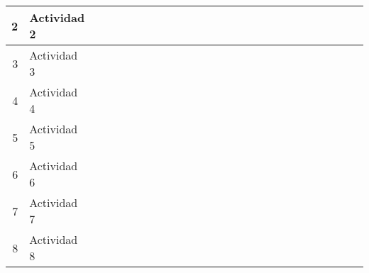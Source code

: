 \begin{landscape}
\begin{table}[htbp]
{\begin{tabular}{|r|l|r|r|r|r|r|r|r|r|r|r|r|r|r|r|r|r|r|r|r|r|r|r|r|r|}
			\midrule
			2     & Actividad 2 &       &       &       & \cellcolor[rgb]{ .557,  .663,  .859} & \cellcolor[rgb]{ .557,  .663,  .859} & \cellcolor[rgb]{ .557,  .663,  .859} & \cellcolor[rgb]{ .557,  .663,  .859} &       &       &       &       &       &       &       &       &       &       &       &       &       &       &       &       &  \\
			\midrule
			3     & Actividad 3 & \cellcolor[rgb]{ .557,  .663,  .859} & \cellcolor[rgb]{ .557,  .663,  .859} & \cellcolor[rgb]{ .557,  .663,  .859} &       &       &       &       &       &       &       &       &       &       &       &       &       &       &       &       &       &       &       &       &  \\
			\midrule
			4     & Actividad 4 &       &       &       &       &       &       &       & \cellcolor[rgb]{ .557,  .663,  .859} & \cellcolor[rgb]{ .557,  .663,  .859} & \cellcolor[rgb]{ .557,  .663,  .859} & \cellcolor[rgb]{ .557,  .663,  .859} & \cellcolor[rgb]{ .557,  .663,  .859} &       &       &       &       &       &       &       &       &       &       &       &  \\
			\midrule
			5     & Actividad 5 &       &       &       &       &       &       &       & \cellcolor[rgb]{ .557,  .663,  .859} & \cellcolor[rgb]{ .557,  .663,  .859} & \cellcolor[rgb]{ .557,  .663,  .859} & \cellcolor[rgb]{ .557,  .663,  .859} & \cellcolor[rgb]{ .557,  .663,  .859} &       &       &       &       &       &       &       &       &       &       &       &  \\
			\midrule
			6     & Actividad 6 &       &       &       &       &       &       &       &       &       &       &       &       & \cellcolor[rgb]{ .557,  .663,  .859} & \cellcolor[rgb]{ .557,  .663,  .859} & \cellcolor[rgb]{ .557,  .663,  .859} & \cellcolor[rgb]{ .557,  .663,  .859} &       &       &       &       &       &       &       &  \\
			\midrule
			7     & Actividad 7 &       &       &       &       &       &       &       &       &       &       &       &       &       & \cellcolor[rgb]{ .557,  .663,  .859} & \cellcolor[rgb]{ .557,  .663,  .859} & \cellcolor[rgb]{ .557,  .663,  .859} & \cellcolor[rgb]{ .557,  .663,  .859} & \cellcolor[rgb]{ .557,  .663,  .859} &       &       &       &       &       &  \\
			\midrule
			8     & Actividad 8 &       &       &       &       &       &       &       &       &       &       &       &       &       &       &       &       &       &       & \cellcolor[rgb]{ .557,  .663,  .859} & \cellcolor[rgb]{ .557,  .663,  .859} & \cellcolor[rgb]{ .557,  .663,  .859} & \cellcolor[rgb]{ .557,  .663,  .859} &       &  \\

\end{tabular}}
\end{table}
\end{landscape}
